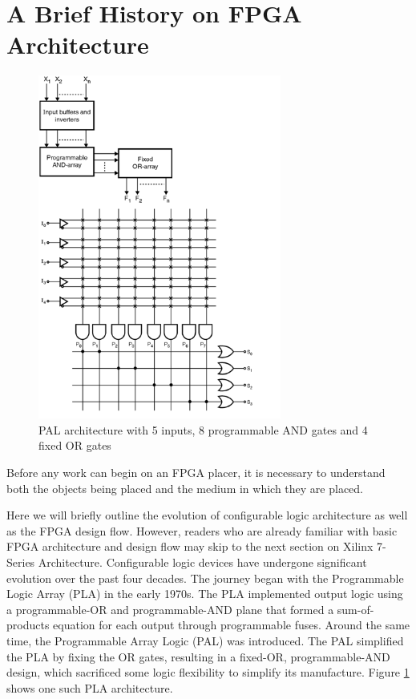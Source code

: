 \documentclass[twocolumn]{article}
\begin{document}
\section{A Brief History on FPGA Architecture}

    \begin{figure}
        \centering
        \includegraphics[width=8.0cm]{figures/pal_2.png}
        \caption{PAL architecture with 5 inputs, 8 programmable AND gates and 4 fixed OR gates}
        \label{fig:pla}
    \end{figure}

    Before any work can begin on an FPGA placer, it is necessary to understand both the objects being placed and the medium in which they are placed.

    Here we will briefly outline the evolution of configurable logic architecture as well as the FPGA design flow. 
    However, readers who are already familiar with basic FPGA architecture and design flow may skip to the next section on Xilinx 7-Series Architecture. 
    Configurable logic devices have undergone significant evolution over the past four decades. 
    The journey began with the Programmable Logic Array (PLA) in the early 1970s. 
    The PLA implemented output logic using a programmable-OR and programmable-AND plane that formed a sum-of-products equation for each output through programmable fuses. 
    Around the same time, the Programmable Array Logic (PAL) was introduced. 
    The PAL simplified the PLA by fixing the OR gates, resulting in a fixed-OR, programmable-AND design, which sacrificed some logic flexibility to simplify its manufacture. 
    Figure \ref{fig:pla} shows one such PLA architecture. 
\end{document}
